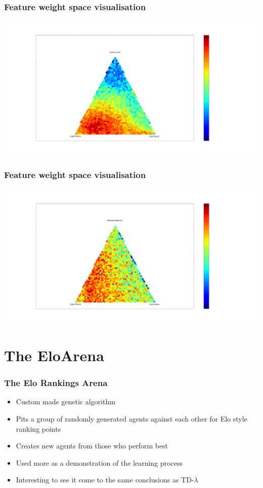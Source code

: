 \documentclass[10pt]{beamer}
\begin{document}
\begin{frame}
  \frametitle{Feature weight space visualisation}
  \begin{center} \includegraphics[trim= 12cm 4cm 23cm 7cm, clip, height=7cm]{Graphs/LegalMoves_Count_SidePieces_Triangle.pdf}  \end{center}
\end{frame}

\begin{frame}
  \frametitle{Feature weight space visualisation}
  \begin{center} \includegraphics[trim= 12cm 4cm 23cm 7cm, clip, height=7cm]{Graphs/LegalMoves_BlockedAdjacent_SidePieces_Triangle.pdf}  \end{center} 
\end{frame}

\section{The EloArena}

\begin{frame}
  \frametitle{The Elo Rankings Arena}
  \begin{itemize}
  \item<1-> Custom made genetic algorithm
  \item<1-> Pits a group of randomly generated agents against each other for Elo style ranking points
  \item<1-> Creates new agents from those who perform best
  \item<2-> Used more as a demonstration of the learning process
  \item<2-> Interesting to see it come to the same conclusions as TD-$\lambda$
  \end{itemize}
\end{frame}
\end{document}
